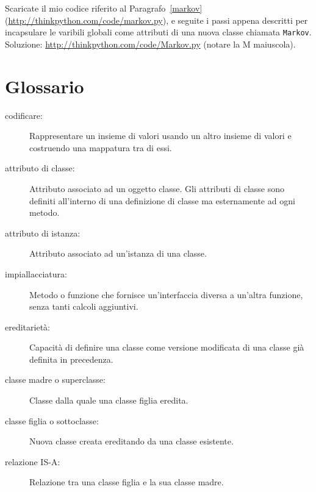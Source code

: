 \documentclass[10pt]{book}
\begin{document}
\begin{exercise}

Scaricate il mio codice riferito al Paragrafo~\ref{markov}
(\url{http://thinkpython.com/code/markov.py}), e seguite i passi appena descritti per incapsulare le varibili globali come attributi di una nuova classe chiamata {\tt Markov}.  Soluzione: \url{http://thinkpython.com/code/Markov.py} (notare la M maiuscola).

\end{exercise}




\section{Glossario}

\begin{description}

\item[codificare:]  Rappresentare un insieme di valori usando un altro insieme di valori e costruendo una mappatura tra di essi.

\item[attributo di classe:] Attributo associato ad un oggetto classe. Gli attributi di classe sono definiti all'interno di una definizione di classe ma esternamente ad ogni metodo.

\item[attributo di istanza:] Attributo associato ad un'istanza di una classe.

\item[impiallacciatura:] Metodo o funzione che fornisce un'interfaccia diversa a un'altra funzione, senza tanti calcoli aggiuntivi.

\item[ereditarietà:] Capacità di definire una classe come versione modificata di una classe già definita in precedenza.

\item[classe madre o superclasse:] Classe dalla quale una classe figlia eredita.

\item[classe figlia o sottoclasse:] Nuova classe creata ereditando da una classe esistente.


\item[relazione IS-A:] Relazione tra una classe figlia e la sua classe madre.


\end{description}
\end{document}
